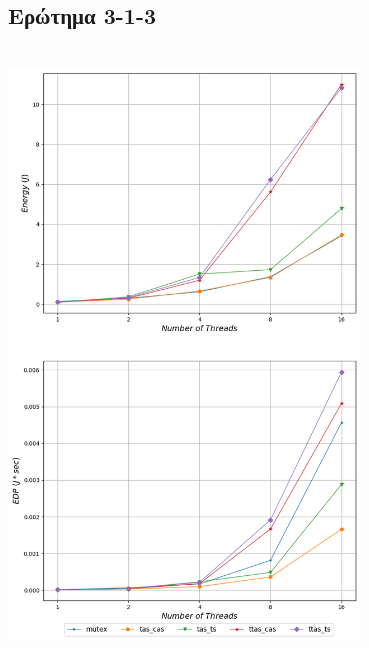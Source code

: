 \subsection{Ερώτημα 3-1-3}



\begin{minipage}{\textwidth}
   \begin{center}
      \\
      \vspace{3mm}
      \includegraphics[width=0.7\textwidth]{./graphs/energy/grain-1.png}
      \vspace{6mm}
   \end{center}
\end{minipage}


